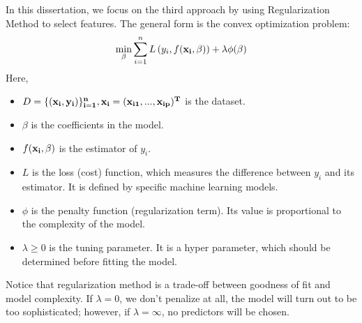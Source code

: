 \documentclass[]{article}
\begin{document}
In this dissertation, we focus on the third approach by using Regularization Method\cite{tikhonov1963solution} to select features. The general form is the convex optimization problem:
\begin{equation}
	\min \limits_{\beta}\sum_{i=1}^n L\left(y_i,f(\bf{x_i},\beta)\right) +\lambda \phi(\beta)
\end{equation}
Here, 
\begin{itemize}
	\item $ D=\{(\bf{x_i},y_i)\}_{i=1}^n , \bf{x_i}=(x_{i1},...,x_{ip})^T$ is the dataset.
	\item $ \beta $ is the coefficients in the model.
	\item $ f(\bf{x_i},\beta) $ is the estimator of $ y_i $.
	\item $ L $ is the loss (cost) function, which measures the difference between $ y_i $ and its estimator. It is defined by specific machine learning models.
	\item $\phi$ is the penalty function (regularization term). Its value is proportional to the complexity of the model.
	\item $ \lambda \ge 0$ is the tuning parameter. It is a hyper parameter, which should be determined before fitting the model. 
\end{itemize}
Notice that regularization method is a trade-off between goodness of fit and model complexity. If $\lambda=0$, we don't penalize at all, the model will turn out to be too sophisticated; however, if  $\lambda=\infty$, no predictors will be chosen.
\end{document}
